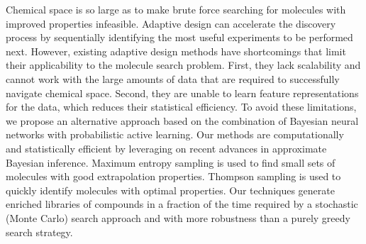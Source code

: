 
Chemical space is so large as to make brute force searching for molecules with
improved properties infeasible. Adaptive design can accelerate the discovery
process by sequentially identifying the most useful experiments to be performed
next. However, existing adaptive design methods have shortcomings that limit
their applicability to the molecule search problem. First, they lack
scalability and cannot work with the large amounts of data that are required to
successfully navigate chemical space. Second, they are unable to learn feature
representations for the data, which reduces their statistical efficiency. To
avoid these limitations, we propose an alternative approach based on the
combination of Bayesian neural networks with probabilistic active learning. Our
methods are computationally and statistically efficient by leveraging on recent
advances in approximate Bayesian inference. Maximum entropy sampling is used
to find small sets of molecules with good extrapolation properties. Thompson
sampling is used to quickly identify molecules with optimal properties. Our
techniques generate enriched libraries of compounds in a fraction
of the time required by a stochastic (Monte Carlo) search approach and with
more robustness than a purely greedy search strategy.

